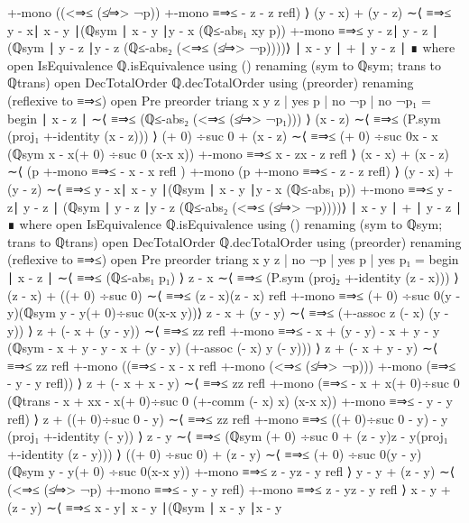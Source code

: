 \documentclass[11pt,a4paper]{article}
\begin{document}
\begin{code}
  +-mono ((<⇒≤ (≰⇒> ¬p)) +-mono ≡⇒≤ { - z}{ - z} refl) ⟩
  (y - x) + (y - z) ∼⟨  ≡⇒≤ {y - x}{∣ x - y ∣}(ℚsym {∣ x - y ∣}{y - x}
  (ℚ≤-abs₁ {x}{y} p)) +-mono ≡⇒≤ {y - z}{∣ y - z ∣}
  (ℚsym {∣ y - z ∣}{y - z} (ℚ≤-abs₂ (<⇒≤ (≰⇒> ¬p))))⟩
  ∣ x - y ∣ + ∣ y - z ∣ ∎ 
     where
     open IsEquivalence ℚ.isEquivalence using ()
       renaming (sym to ℚsym; trans to ℚtrans)
     open DecTotalOrder ℚ.decTotalOrder using (preorder)
       renaming (reflexive to ≡⇒≤)
     open Pre preorder
triang x y z | yes p | no ¬p | no ¬p₁ = begin
  ∣ x - z ∣   ∼⟨ ≡⇒≤ (ℚ≤-abs₂ (<⇒≤ (≰⇒> ¬p₁))) ⟩
  (x - z) ∼⟨   ≡⇒≤ (P.sym (proj₁ +-identity (x - z)))  ⟩
  (+ 0) ÷suc 0 + (x - z) ∼⟨  ≡⇒≤ {(+ 0) ÷suc 0}{x - x}
  (ℚsym {x - x}{(+ 0) ÷suc 0} (x-x {x})) +-mono ≡⇒≤ {x - z}{x - z} refl ⟩
  (x - x) + (x - z) ∼⟨  (p  +-mono ≡⇒≤ { - x}{ - x} refl ) +-mono
  (p +-mono ≡⇒≤ { - z}{ - z} refl) ⟩
  (y - x) + (y - z) ∼⟨  ≡⇒≤ {y - x}{∣ x - y ∣}(ℚsym {∣ x - y ∣}{y - x}
  (ℚ≤-abs₁ p)) +-mono ≡⇒≤ {y - z}{∣ y - z ∣} (ℚsym {∣ y - z ∣}{y - z}
  (ℚ≤-abs₂ (<⇒≤ (≰⇒> ¬p))))⟩ 
  ∣ x - y ∣ + ∣ y - z ∣ ∎ 
     where
     open IsEquivalence ℚ.isEquivalence using ()
       renaming (sym to ℚsym; trans to ℚtrans)
     open DecTotalOrder ℚ.decTotalOrder using (preorder)
       renaming (reflexive to ≡⇒≤)
     open Pre preorder
triang x y z | no ¬p | yes p | yes p₁ = begin
  ∣ x - z ∣                 ∼⟨ ≡⇒≤ (ℚ≤-abs₁ p₁)   ⟩
  z - x                    ∼⟨ ≡⇒≤ (P.sym (proj₂ +-identity (z - x))) ⟩
  (z - x) + ((+ 0) ÷suc 0) ∼⟨  ≡⇒≤ {(z - x)}{(z - x)} refl
  +-mono ≡⇒≤ {(+ 0) ÷suc 0}{(y - y)}(ℚsym {y - y}{(+ 0)÷suc 0}(x-x {y}))⟩
  z - x + (y - y)          ∼⟨ ≡⇒≤ (+-assoc z (- x) (y - y)) ⟩
  z + (- x + (y - y))      ∼⟨ ≡⇒≤ {z}{z} refl +-mono
  ≡⇒≤ { - x + (y - y)}{ - x + y - y}
  (ℚsym { - x + y - y}{ - x + (y - y)} (+-assoc (- x) y (- y))) ⟩
  z + (- x + y - y)        ∼⟨ ≡⇒≤ {z}{z} refl +-mono
  ((≡⇒≤ { - x}{ - x} refl  +-mono  (<⇒≤ (≰⇒> ¬p)))
  +-mono (≡⇒≤ { - y}{ - y} refl)) ⟩
  z + (- x + x - y)        ∼⟨ ≡⇒≤ {z}{z} refl +-mono
  (≡⇒≤ { - x + x}{(+ 0)÷suc 0} (ℚtrans { - x + x}{x - x}{(+ 0)÷suc 0}
  (+-comm (- x) x) (x-x {x})) +-mono ≡⇒≤ { - y}{ - y} refl) ⟩
  z + ((+ 0)÷suc 0 - y) ∼⟨ ≡⇒≤ {z}{z} refl +-mono
  ≡⇒≤ {((+ 0)÷suc 0 - y)}{ - y} (proj₁ +-identity (- y)) ⟩
  z - y ∼⟨ ≡⇒≤  (ℚsym {(+ 0) ÷suc 0 + (z - y)}{z - y}(proj₁ +-identity (z - y))) ⟩
  ((+ 0) ÷suc 0) + (z - y) ∼⟨ ≡⇒≤ {(+ 0) ÷suc 0}{(y - y)}
  (ℚsym {y - y}{(+ 0) ÷suc 0}(x-x {y})) +-mono ≡⇒≤ {z - y}{z - y} refl ⟩
  y - y + (z - y) ∼⟨ (<⇒≤ (≰⇒> ¬p) +-mono ≡⇒≤ { - y}{ - y} refl)
  +-mono ≡⇒≤ {z - y}{z - y} refl ⟩
  x - y + (z - y) ∼⟨ ≡⇒≤ {x - y}{∣ x - y ∣}(ℚsym {∣ x - y ∣}{x - y}

\end{code}
\end{document}
